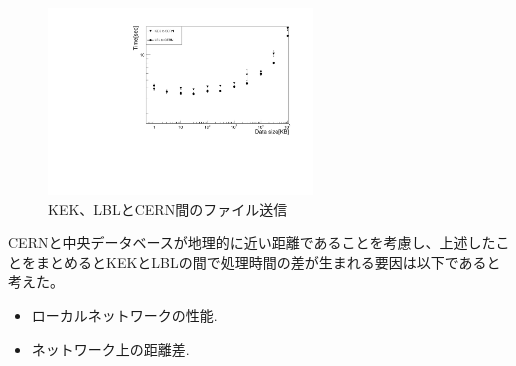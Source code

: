 \begin{figure}[bpt]\centering
  \begin{center}
    \includegraphics[width=7cm,angle=270]{./scp_to_cern.pdf}
  \caption[KEK、LBLとCERN間のファイル送信]{KEK、LBLとCERN間のファイル送信}
  \label{datasize_vs_time_cern}
  \end{center}
\end{figure}

CERNと中央データベースが地理的に近い距離であることを考慮し、上述したことをまとめるとKEKとLBLの間で処理時間の差が生まれる要因は以下であると考えた。
\begin{itemize}
  \item ローカルネットワークの性能.
  \item ネットワーク上の距離差.
\end{itemize}

